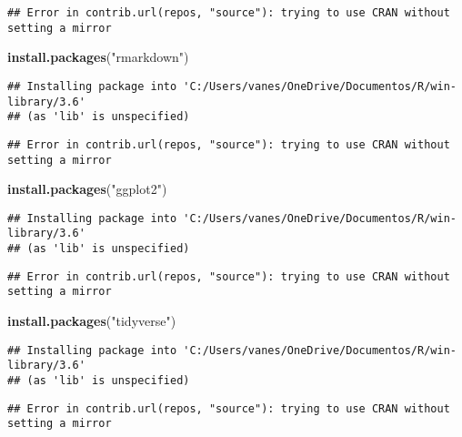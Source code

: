 \documentclass[
]{article}
\newenvironment{Shaded}{\begin{snugshade}}{\end{snugshade}}
\newcommand{\KeywordTok}[1]{\textcolor[rgb]{0.13,0.29,0.53}{\textbf{#1}}}
\newcommand{\NormalTok}[1]{#1}
\newcommand{\StringTok}[1]{\textcolor[rgb]{0.31,0.60,0.02}{#1}}
\begin{document}
\begin{verbatim}
## Error in contrib.url(repos, "source"): trying to use CRAN without setting a mirror
\end{verbatim}

\begin{Shaded}
\begin{Highlighting}[]
\KeywordTok{install.packages}\NormalTok{(}\StringTok{"rmarkdown"}\NormalTok{)}
\end{Highlighting}
\end{Shaded}

\begin{verbatim}
## Installing package into 'C:/Users/vanes/OneDrive/Documentos/R/win-library/3.6'
## (as 'lib' is unspecified)
\end{verbatim}

\begin{verbatim}
## Error in contrib.url(repos, "source"): trying to use CRAN without setting a mirror
\end{verbatim}

\begin{Shaded}
\begin{Highlighting}[]
\KeywordTok{install.packages}\NormalTok{(}\StringTok{"ggplot2"}\NormalTok{)}
\end{Highlighting}
\end{Shaded}

\begin{verbatim}
## Installing package into 'C:/Users/vanes/OneDrive/Documentos/R/win-library/3.6'
## (as 'lib' is unspecified)
\end{verbatim}

\begin{verbatim}
## Error in contrib.url(repos, "source"): trying to use CRAN without setting a mirror
\end{verbatim}

\begin{Shaded}
\begin{Highlighting}[]
\KeywordTok{install.packages}\NormalTok{(}\StringTok{"tidyverse"}\NormalTok{)}
\end{Highlighting}
\end{Shaded}

\begin{verbatim}
## Installing package into 'C:/Users/vanes/OneDrive/Documentos/R/win-library/3.6'
## (as 'lib' is unspecified)
\end{verbatim}

\begin{verbatim}
## Error in contrib.url(repos, "source"): trying to use CRAN without setting a mirror
\end{verbatim}
\end{document}
